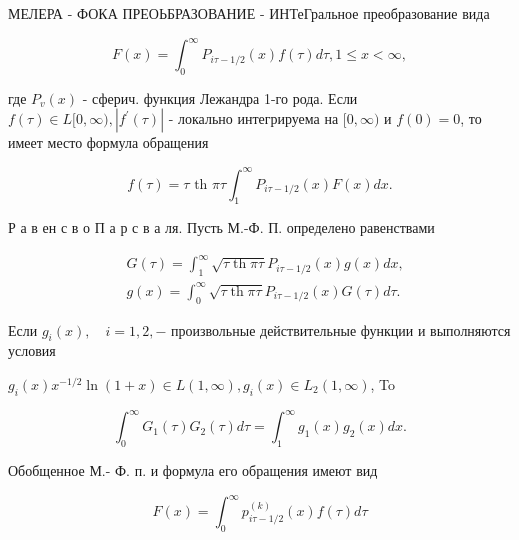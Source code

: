 \documentclass[10pt]{article}
\begin{document}
МЕЛЕРА - ФОКА ПРЕОЬБРАЗОВАНИЕ - ИНТеГральное преобразование вида



\[

F(x)=\int_{0}^{\infty} P_{i \tau-1 / 2}(x) f(\tau) d \tau, 1 \leqslant x<\infty,

\]



где $P_{v}(x)$ - сферич. функция Лежандра 1-го рода. Если $f(\tau) \in L[0, \infty),\left|f^{\prime}(\tau)\right|$ - локально интегрируема на $[0, \infty)$ и $f(0)=0$, то имеет место формула обращения



\[

f(\tau)=\tau \text { th } \pi \tau \int_{1}^{\infty} P_{i \tau-1 / 2}(x) F(x) d x .

\]



Р а в ен с в о П а р с в а ля. Пусть М.-Ф. П. определено равенствами



\[

\begin{aligned}

& G(\tau)=\int_{1}^{\infty} \sqrt{\tau \operatorname{th} \pi \tau} P_{i \tau-1 / 2}(x) g(x) d x, \\

& g(x)=\int_{0}^{\infty} \sqrt{\tau \operatorname{th} \pi \tau} P_{i \tau-1 / 2}(x) G(\tau) d \tau .

\end{aligned}

\]



Если $g_{i}(x), \quad i=1,2,-$ произвольные действительные функции и выполняются условия



$g_{i}(x) x^{-1 / 2} \ln (1+x) \in L(1, \infty), g_{i}(x) \in L_{2}(1, \infty)$, To



\[

\int_{0}^{\infty} G_{1}(\tau) G_{2}(\tau) d \tau=\int_{1}^{\infty} g_{1}(x) g_{2}(x) d x .

\]



Обобщенное М.- Ф. п. и формула его обращения имеют вид



\[

F(x)=\int_{0}^{\infty} p_{i \tau-1 / 2}^{(k)}(x) f(\tau) d \tau

\]
\end{document}
